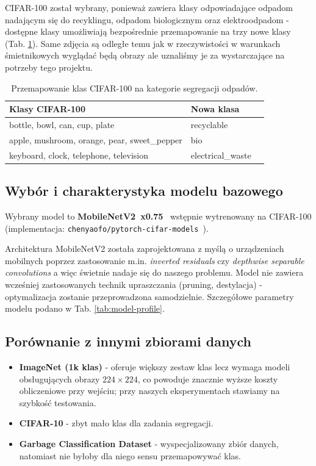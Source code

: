 \documentclass[12pt,twocolumn]{article}
\begin{document}
CIFAR-100 został wybrany, ponieważ zawiera klasy odpowiadające
odpadom nadającym się do recyklingu, odpadom biologicznym oraz
elektroodpadom - dostępne klasy umożliwiają bezpośrednie przemapowanie
na trzy nowe klasy (Tab. \ref{tab:class-mapping}).
Same zdjęcia są odległe temu jak w rzeczywistości w warunkach śmietnikowych wyglądać będą obrazy
ale uznaliśmy je za wystarczające na potrzeby tego projektu.

\begin{table}[ht]
\centering
\caption{Przemapowanie klas CIFAR-100 na kategorie segregacji odpadów.}
\label{tab:class-mapping}
\begin{tabular}{lll}
\toprule
\textbf{Klasy CIFAR-100} & \textbf{Nowa klasa} \\
\midrule
bottle, bowl, can, cup, plate & recyclable       \\
apple, mushroom, orange, pear, sweet\_pepper& bio    \\
keyboard, clock, telephone, television & electrical\_waste \\
\bottomrule
\end{tabular}
\end{table}

\subsection{Wybór i charakterystyka modelu bazowego}

Wybrany model to \textbf{MobileNetV2~x0.75}~\cite{sandler2018mobilenetv2}
wstępnie wytrenowany na CIFAR-100 (implementacja: \texttt{chenyaofo/pytorch-cifar-models}~\cite{chenyaofo2021cifar}).

Architektura MobileNetV2 została zaprojektowana z myślą o urządzeniach
mobilnych poprzez zastosowanie m.in. \textit{inverted residuals} czy \textit{depthwise separable convolutions} a więc świetnie nadaje się do naszego
problemu. Model nie zawiera wcześniej zastosowanych technik upraszczania (pruning,
destylacja) - optymalizacja zostanie przeprowadzona samodzielnie. Szczegółowe parametry modelu podano w Tab. \ref{tab:model-profile}.



\subsection{Porównanie z innymi zbiorami danych}

\begin{itemize}
  \item \textbf{ImageNet (1k klas)} - oferuje większy zestaw klas lecz wymaga
        modeli obsługujących obrazy $224\times224$, co powoduje znacznie wyższe koszty obliczeniowe
        przy wejściu; przy naszych eksperymentach stawiamy na szybkość testowania.
  \item \textbf{CIFAR-10} - zbyt mało klas dla zadania segregacji.
  \item \textbf{Garbage Classification Dataset} - wyspecjalizowany zbiór danych, natomiast nie byłoby dla niego sensu
  przemapowywać klas.
\end{itemize}
\end{document}
